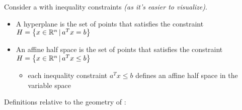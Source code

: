 \documentclass[english]{article}
\begin{document}
\bigskip
Consider a \LP with inequality constraints \textit{(as it's easier to visualize)}.

\begin{itemize}
  \item A hyperplane is the set of points that satisfies the constraint
        \( H = \left\{ x \in \mathbb{R}^n \, | \, a^T x = b \right\} \)
  \item An affine half space is the set of points that satisfies the constraint
        \(H = \left\{ x \in \mathbb{R}^n \, | \, a^T x \leq b \right\} \)
        \begin{itemize}[label=\(\rightarrow\)]
          \item each inequality constraint \(a^T x \leq b\) defines an affine half space in the variable space
        \end{itemize}
\end{itemize}

\bigskip
Definitions relative to the geometry of \LP:
\end{document}
